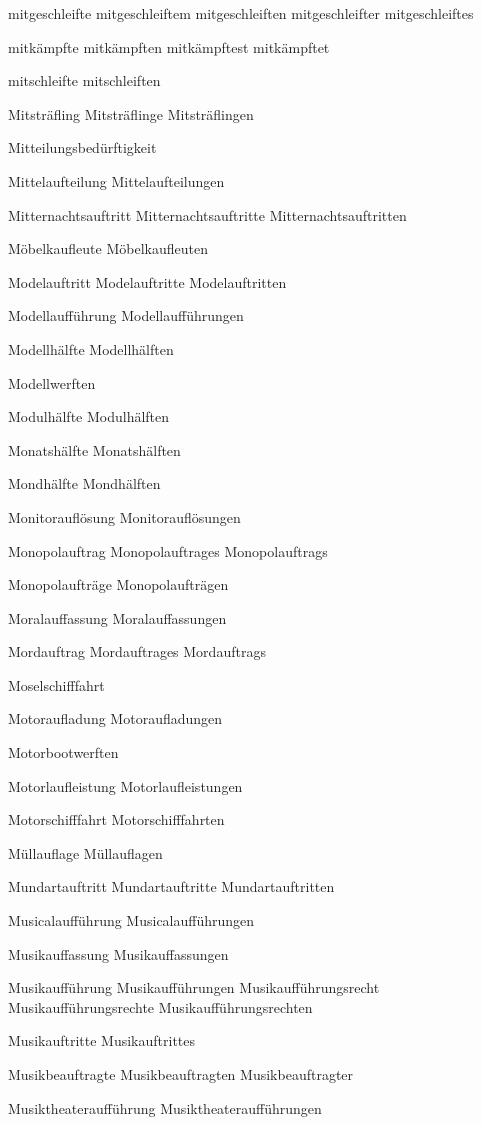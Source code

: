 mitgeschleifte
mitgeschleiftem
mitgeschleiften
mitgeschleifter
mitgeschleiftes

mitkämpfte
mitkämpften
mitkämpftest
mitkämpftet

mitschleifte
mitschleiften

Mitsträfling
Mitsträflinge
Mitsträflingen

Mitteilungsbedürftigkeit

Mittelaufteilung
Mittelaufteilungen

Mitternachtsauftritt
Mitternachtsauftritte
Mitternachtsauftritten

Möbelkaufleute
Möbelkaufleuten

Modelauftritt
Modelauftritte
Modelauftritten

Modellaufführung
Modellaufführungen

Modellhälfte
Modellhälften

Modellwerften

Modulhälfte
Modulhälften

Monatshälfte
Monatshälften

Mondhälfte
Mondhälften

Monitorauflösung
Monitorauflösungen

Monopolauftrag
Monopolauftrages
Monopolauftrags

Monopolaufträge
Monopolaufträgen

Moralauffassung
Moralauffassungen

Mordauftrag
Mordauftrages
Mordauftrags

Moselschifffahrt

Motoraufladung
Motoraufladungen

Motorbootwerften

Motorlaufleistung
Motorlaufleistungen

Motorschifffahrt
Motorschifffahrten

Müllauflage
Müllauflagen

Mundartauftritt
Mundartauftritte
Mundartauftritten

Musicalaufführung
Musicalaufführungen

Musikauffassung
Musikauffassungen

Musikaufführung
Musikaufführungen
Musikaufführungsrecht
Musikaufführungsrechte
Musikaufführungsrechten

Musikauftritte
Musikauftrittes

Musikbeauftragte
Musikbeauftragten
Musikbeauftragter

Musiktheateraufführung
Musiktheateraufführungen

